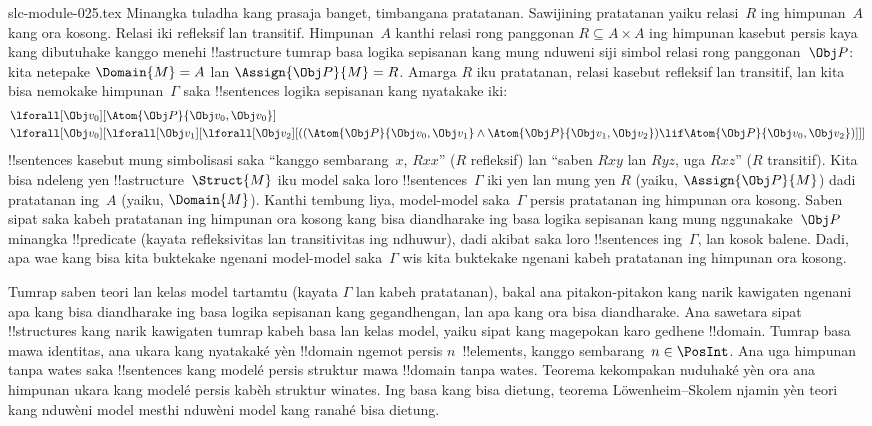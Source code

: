 \begin{filecontents*}[overwrite]{slc-module-025.tex}
Minangka tuladha kang prasaja banget, timbangana pratatanan. Sawijining
pratatanan yaiku relasi~$R$ ing himpunan~$A$ kang ora kosong. Relasi iki
refleksif lan transitif. Himpunan~$A$ kanthi relasi rong panggonan $R \subseteq A
\times A$ ing himpunan kasebut persis kaya kang dibutuhake kanggo
menehi !!a{structure} tumrap basa logika sepisanan kang mung nduweni
siji simbol relasi rong panggonan~$\Obj P$: kita netepake
$\Domain{M} = A$ lan $\Assign{\Obj P}{M} = R$. Amarga $R$ iku
pratatanan, relasi kasebut refleksif lan transitif, lan kita bisa
nemokake himpunan~$\Gamma$ saka !!{sentence}s logika sepisanan kang
nyatakake iki:
\begin{align*}
  & \lforall[\Obj v_0][\Atom{\Obj P}{\Obj v_0,\Obj v_0}]\\
  & \lforall[\Obj v_0][\lforall[\Obj v_1][\lforall[\Obj v_2][((\Atom{\Obj P}{\Obj v_0,\Obj v_1} \land \Atom{\Obj P}{\Obj v_1,\Obj v_2}) \lif \Atom{\Obj P}{\Obj v_0,\Obj v_2})]]]
\end{align*}
!!{sentence}s kasebut mung simbolisasi saka ``kanggo sembarang~$x$,
$Rxx$'' ($R$ refleksif) lan ``saben $Rxy$ lan $Ryz$, uga $Rxz$''
($R$ transitif). Kita bisa ndeleng yen !!a{structure}~$\Struct{M}$ iku
model saka loro !!{sentence}s~$\Gamma$ iki yen lan mung yen $R$
(yaiku, $\Assign{\Obj P}{M}$) dadi pratatanan ing~$A$ (yaiku,
$\Domain{M}$). Kanthi tembung liya, model-model saka~$\Gamma$ persis
pratatanan ing himpunan ora kosong. Saben sipat saka kabeh pratatanan ing himpunan ora kosong kang bisa diandharake ing
basa logika sepisanan kang mung nggunakake~$\Obj P$ minangka
!!{predicate} (kayata refleksivitas lan transitivitas ing ndhuwur),
dadi akibat saka loro !!{sentence}s ing~$\Gamma$, lan kosok balene.
Dadi, apa wae kang bisa kita buktekake ngenani model-model saka~$\Gamma$
wis kita buktekake ngenani kabeh pratatanan ing himpunan ora kosong.

Tumrap saben teori lan kelas model tartamtu (kayata $\Gamma$ lan kabeh
pratatanan), bakal ana pitakon-pitakon kang narik kawigaten ngenani apa
kang bisa diandharake ing basa logika sepisanan kang gegandhengan, lan
apa kang ora bisa diandharake. Ana sawetara sipat !!{structure}s kang
narik kawigaten tumrap kabeh basa lan kelas model, yaiku sipat kang
magepokan karo gedhene !!{domain}. Tumrap basa mawa identitas, ana ukara kang
nyatakaké yèn !!{domain} ngemot persis $n$~!!{element}s, kanggo
sembarang~$n \in \PosInt$. Ana uga himpunan tanpa wates saka
!!{sentence}s kang modelé persis struktur mawa !!{domain} tanpa wates.
Teorema kekompakan nuduhaké yèn ora ana himpunan ukara kang
modelé persis kabèh struktur winates. Ing basa kang bisa dietung,
teorema L\"owenheim--Skolem njamin yèn teori kang nduwèni model
mesthi nduwèni model kang ranahé bisa dietung.


\end{filecontents*}

